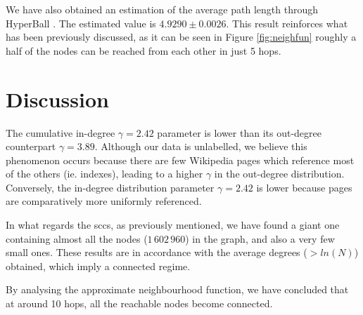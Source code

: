 \documentclass[9pt,a4paper,twocolumn]{article}
\begin{document}
We have also obtained an estimation of the average path length through HyperBall \cite{Boldi2011HyperANFAT}. The estimated value is $ 4.9290 \pm 0.0026 $. This result reinforces what has been previously discussed, as it can be seen in Figure \ref{fig:neighfun} roughly a half of the nodes can be reached from each other in just 5 hops.

\section{Discussion}

The cumulative in-degree $\gamma = 2.42$ parameter is lower than its out-degree counterpart $\gamma = 3.89$. Although our data is unlabelled, we believe this phenomenon occurs because there are few Wikipedia pages which reference most of the others (ie. indexes), leading to a higher $\gamma$ in the out-degree distribution. Conversely, the in-degree distribution parameter $\gamma = 2.42$ is lower because pages are comparatively more uniformly referenced.

In what regards the \acrshort{scc}s, as previously mentioned, we have found a giant one %
containing almost all the nodes ($1\,602\,960$) in the graph, and also a very few small ones. These results are in accordance with the average degrees ($> ln(N)$) obtained, which imply a connected regime.

By analysing the approximate neighbourhood function, we have concluded that at around 10 hops, all the reachable nodes become connected.


\printglossary[type=\acronymtype]



\end{document}
